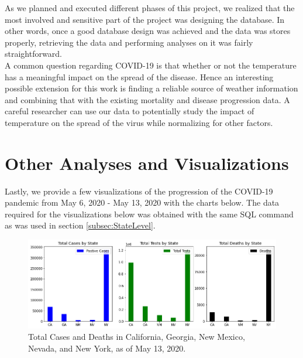 \documentclass[11pt]{article}
\begin{document}
\noindent
As we planned and executed different phases of this project, we realized that the most involved and sensitive part of the project was designing the database. In other words, once a good database design was achieved and the data was stores properly, retrieving the data and performing analyses on it was fairly straightforward.\\

\noindent
 A common question regarding COVID-19 is that whether or not the temperature has a meaningful impact on the spread of the disease. Hence an interesting possible extension for this work is finding a reliable source of weather information and combining that with the existing mortality and disease progression data. A careful researcher can use our data to potentially study the impact of temperature on the spread of the virus while normalizing for other factors.




\appendix

\section{Other Analyses and Visualizations}

\noindent
Lastly, we provide a few visualizations of the progression of the COVID-19 pandemic from May 6, 2020 - May 13, 2020 with the charts below. The data required for the visualizations below was obtained with the same SQL command as was used in section \ref{subsec:StateLevel}.

\FloatBarrier
\begin{figure}[h]
    \centering
    \includegraphics[width=\linewidth]{diagrams/analysis/total_cases_bar.png}
    \caption{Total Cases and Deaths in California, Georgia, New Mexico, Nevada, and New York, as of May 13, 2020.}
    \label{fig:overall}
\end{figure}
\FloatBarrier
\end{document}
